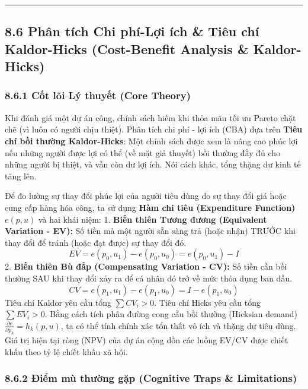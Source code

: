 \documentclass[
]{article}
\begin{document}
\begin{center}\rule{0.5\linewidth}{0.5pt}\end{center}

\subsection{8.6 Phân tích Chi phí-Lợi ích \& Tiêu chí Kaldor-Hicks
(Cost-Benefit Analysis \&
Kaldor-Hicks)}\label{phuxe2n-tuxedch-chi-phuxed-lux1ee3i-uxedch-tiuxeau-chuxed-kaldor-hicks-cost-benefit-analysis-kaldor-hicks}

\subsubsection{8.6.1 Cốt lõi Lý thuyết (Core
Theory)}\label{cux1ed1t-luxf5i-luxfd-thuyux1ebft-core-theory-30}

Khi đánh giá một dự án công, chính sách hiếm khi thỏa mãn tối ưu Pareto
chặt chẽ (vì luôn có người chịu thiệt). Phân tích chi phí - lợi ích
(CBA) dựa trên \textbf{Tiêu chí bồi thường Kaldor-Hicks}: Một chính sách
được xem là nâng cao phúc lợi nếu những người được lợi có thể (về mặt
giả thuyết) bồi thường đầy đủ cho những người bị thiệt, và vẫn còn dư
lợi ích. Nói cách khác, tổng thặng dư kinh tế tăng lên.

Để đo lường sự thay đổi phúc lợi của người tiêu dùng do sự thay đổi giá
hoặc cung cấp hàng hóa công, ta sử dụng \textbf{Hàm chi tiêu
(Expenditure Function)} \(e(p, u)\) và hai khái niệm: 1. \textbf{Biến
thiên Tương đương (Equivalent Variation - EV):} Số tiền mà một người sẵn
sàng trả (hoặc nhận) TRƯỚC khi thay đổi để tránh (hoặc đạt được) sự thay
đổi đó. \[ EV = e(p_0, u_1) - e(p_0, u_0) = e(p_0, u_1) - I \] 2.
\textbf{Biến thiên Bù đắp (Compensating Variation - CV):} Số tiền cần
bồi thường SAU khi thay đổi xảy ra để cá nhân đó trở về mức thỏa dụng
ban đầu. \[ CV = e(p_1, u_1) - e(p_1, u_0) = I - e(p_1, u_0) \] Tiêu chí
Kaldor yêu cầu tổng \(\sum CV_i > 0\). Tiêu chí Hicks yêu cầu tổng
\(\sum EV_i > 0\). Bằng cách tích phân đường cong cầu bồi thường
(Hicksian demand) \(\frac{\partial e}{\partial p_k} = h_k(p, u)\), ta có
thể tính chính xác tổn thất vô ích và thặng dư tiêu dùng. Giá trị hiện
tại ròng (NPV) của dự án cộng dồn các luồng EV/CV được chiết khấu theo
tỷ lệ chiết khấu xã hội.

\subsubsection{8.6.2 Điểm mù thường gặp (Cognitive Traps \&
Limitations)}\label{ux111iux1ec3m-muxf9-thux1b0ux1eddng-gux1eb7p-cognitive-traps-limitations-63}
\end{document}

